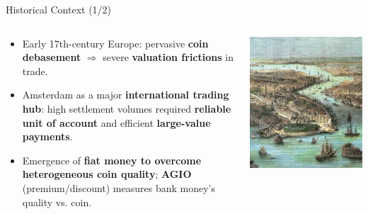 \documentclass[aspectratio=169, xcolor=table]{beamer}
\begin{document}
\begin{frame}{Historical Context (1/2)}


  \begin{columns}
    \begin{column}{0.55\textwidth}
      \begin{itemize}
        \item Early 17th-century Europe: pervasive \textbf{coin debasement} $\Rightarrow$ severe \textbf{valuation frictions} in trade.
        \item Amsterdam as a major \textbf{international trading hub}: high settlement volumes required \textbf{reliable unit of account} and efficient \textbf{large-value payments}.
        \item Emergence of \textbf{fiat money to overcome heterogeneous coin quality}; \textbf{AGIO} (premium/discount) measures bank money’s quality vs. coin.
      \end{itemize}
    \end{column}
    \begin{column}{0.4\textwidth}
      \begin{center}
        \includegraphics[width=0.87\linewidth]{pasted-images/amsterdam.png}
      \end{center}
    \end{column}
  \end{columns}
\end{frame}
\end{document}
